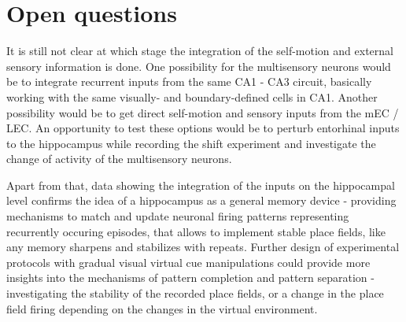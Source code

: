 \section{Open questions}
\label{sec:open_questions}

It is still not clear at which stage the integration of the self-motion and external sensory information is done. One possibility for the multisensory neurons would be to integrate recurrent inputs from the same CA1 - CA3 circuit, basically working with the same visually- and boundary-defined cells in CA1. Another possibility would be to get direct self-motion and sensory inputs from the mEC / LEC. An opportunity to test these options would be to perturb entorhinal inputs to the hippocampus while recording the shift experiment and investigate the change of activity of the multisensory neurons.

Apart from that, data showing the integration of the inputs on the hippocampal level confirms the idea of a hippocampus as a general memory device - providing mechanisms to match and update neuronal firing patterns representing recurrently occuring episodes, that allows to implement stable place fields, like any memory sharpens and stabilizes with repeats. Further design of experimental protocols with gradual visual virtual cue manipulations could provide more insights into the mechanisms of pattern completion and pattern separation - investigating the stability of the recorded place fields, or a change in the place field firing depending on the changes in the virtual environment.
